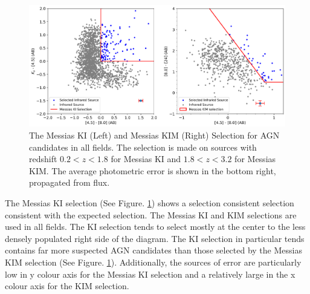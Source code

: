\documentclass[11pt]{iopart}
\begin{document}
\begin{figure}
  \centering
  \includegraphics[width=1\linewidth]{plots/All_fieldsMessiasKIKIMSelection_error.png}
  \caption{The Messias KI (Left) and Messias KIM (Right) Selection for AGN candidates in all fields. The selection is made on sources with redshift $0.2 < z < 1.8$ for Messias KI and $1.8 < z < 3.2$ for Messias KIM. The average photometric error is shown in the bottom right, propagated from flux.}
  \label{fig:MessiasKIKIM}
\end{figure}
\newpage
The Messias KI selection (See Figure. \ref{fig:MessiasKIKIM}) shows a selection consistent selection consistent with the expected selection. The Messias KI and KIM selections are used in all fields. The KI selection tends to select mostly at the center to the less densely populated right side of the diagram. The KI selection in particular tends contains far more suspected AGN candidates than those selected by the Messias KIM selection (See Figure. \ref{fig:MessiasKIKIM}). Additionally, the sources of error are particularly low in y colour axis for the Messias KI selection and a relatively large in the x colour axis for the KIM selection. 
\end{document}
